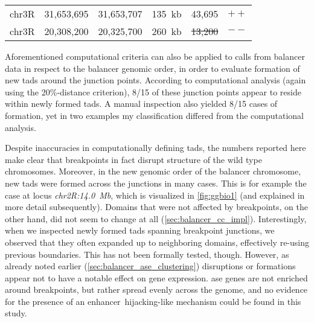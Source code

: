 \begin{table}[th]
\begin{tabu}{lrrrrl}
        chr3R  & 31,653,695  & 31,653,707  &  135~kb &       43,695  &  $++$  \\
        chr3R  & 20,308,200  & 20,325,700  &  260~kb & \sout{13,200} &  $--$  \\
        \bottomrule
    \end{tabu}
\end{table}

Aforementioned computational criteria can also be applied to \tad calls from
balancer \hic data in respect to the balancer genomic order, in order to
evaluate formation of new \acp{tad} around the junction points. According to
computational analysis (again using the 20\%-distance criterion), 8/15 of these
junction points appear to reside within newly formed \acp{tad}. A manual
inspection also yielded 8/15 cases of \tad formation, yet in two examples my
classification differed from the computational analysis.

Despite inaccuracies in computationally defining \acp{tad}, the numbers reported
here make clear that breakpoints in fact disrupt \tad structure of the wild type
chromosomes. Moreover, in the new genomic order of the balancer chromosome, new
\acp{tad} were formed across the junctions in many cases. This is for example the
case at locus \textit{chr2R:14.0~Mb}, which is visualized in \cref{fig:ggbio1}
(and explained in more detail subsequently). Domains that were not affected by
breakpoints, on the other hand, did not seem to change at all
(\cref{sec:balancer_cc_impl}).
Interestingly, when we inspected newly formed \acp{tad} spanning breakpoint
junctions, we observed that they often expanded up to neighboring domains,
effectively re-using previous \tad boundaries. This has not been formally tested,
though. However, as already noted earlier (\cref{sec:balancer_ase_clustering})
\tad disruptions or formations appear not to have a notable effect on gene
expression. \Ac{ase} genes are not enriched around breakpoints, but rather
spread evenly across the genome, and no evidence for the presence of an
enhancer\ hijacking-like mechanism could be found in this study.







